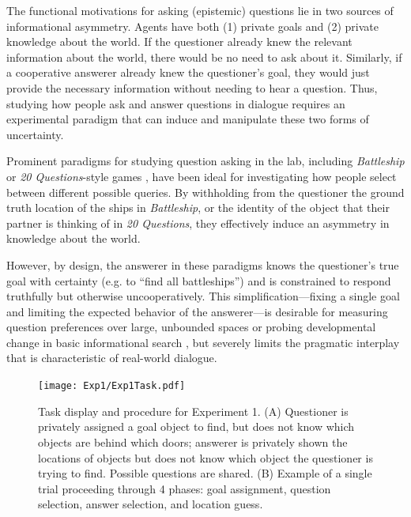 \documentclass[11pt, floatsintext]{apa6}
\begin{document}
The functional motivations for asking (epistemic) questions lie in two sources of informational asymmetry. 
Agents have both (1) private goals and (2) private knowledge about the world. 
If the questioner already knew the relevant information about the world, there would be no need to ask about it.
Similarly, if a cooperative answerer already knew the questioner's goal, they would just provide the necessary information without needing to hear a question.
Thus, studying how people ask and answer questions in dialogue requires an experimental paradigm that can induce and manipulate these two forms of uncertainty.

Prominent paradigms for studying question asking in the lab, including \emph{Battleship} \cite{RotheEtAl16_NaturalLanguageQuestions, rothe2018people} or \emph{20 Questions}-style games \cite{Siegler77_TwentyQuestions, cohen2016searching, NelsonDivjak___Meder14_GuessWho, RuggeriEtAl15_HierarchicalTwentyQs}, have been ideal for investigating how people select between different possible queries.
By withholding from the questioner the ground truth location of the ships in \emph{Battleship}, or the identity of the object that their partner is thinking of in \emph{20 Questions}, they effectively induce an asymmetry in knowledge about the world.

However, by design, the answerer in these paradigms knows the questioner's true goal with certainty (e.g. to ``find all battleships'') and is constrained to respond truthfully but otherwise uncooperatively.
This simplification---fixing a single goal and limiting the expected behavior of the answerer---is desirable for measuring question preferences over large, unbounded spaces \cite{cohen2016searching, rothe2017question} or probing developmental change in basic informational search \cite{RuggeriEtAl15_HierarchicalTwentyQs, ruggeri2016sources}, but severely limits the pragmatic interplay that is characteristic of real-world dialogue. 

\begin{figure}[t!]
\begin{center}
\texttt{[image: Exp1/Exp1Task.pdf]}
\end{center}
\caption{\footnotesize Task display and procedure for Experiment 1. (A) Questioner is privately assigned a goal object to find, but does not know which objects are behind which doors; answerer is privately shown the locations of objects but does not know which object the questioner is trying to find. Possible questions are shared. (B) Example of a single trial proceeding through 4 phases: goal assignment, question selection, answer selection, and location guess.}
\label{fig:expviews}
\end{figure}
\end{document}
